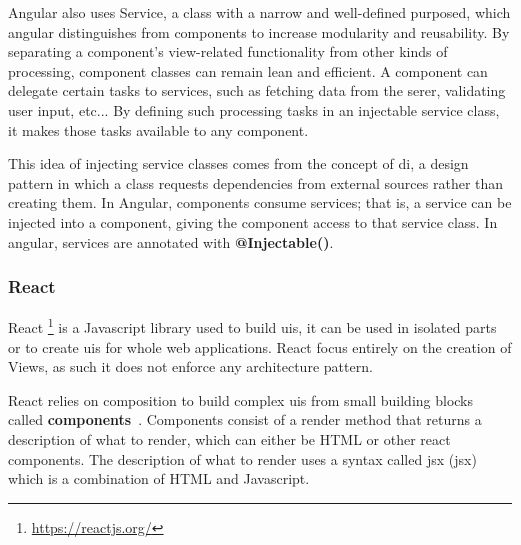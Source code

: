 Angular also uses Service, a class with a narrow and well-defined purposed, which angular distinguishes from components to increase modularity and reusability. By separating a component's view-related functionality from other kinds of processing, component classes can remain lean and efficient. A component can delegate certain tasks to services, such as fetching data from the serer, validating user input, etc...  By defining such processing tasks in an injectable service class, it makes those tasks available to any component.

This idea of injecting service classes comes from the concept of \acrfull{di}, a design pattern in which a class requests dependencies from external sources rather than creating them. In Angular, components consume services; that is, a service can be injected into a component, giving the component access to that service class. In angular, services are annotated with \textbf{@Injectable()}.


\subsubsection{React}
\label{sss:react}




React \footnote{\url{https://reactjs.org/}} is a Javascript library used to build \acrshort{ui}s, it can be used in isolated parts or to create \acrshort{ui}s for whole web applications. React focus entirely on the creation of Views, as such it does not enforce any architecture pattern.

React relies on composition to build complex \acrshort{ui}s from small building blocks called \textbf{components}~\cite{react-lifecycle-functions}. Components consist of a render method that returns a description of what to render, which  can either be HTML or other react components. The description of what to render uses a syntax called \acrlong{jsx} (\acrshort{jsx}) which is a combination of HTML and Javascript. 


